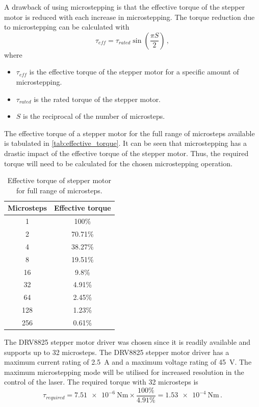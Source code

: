 A drawback of using microstepping is that the effective torque of the stepper motor is reduced with each increase in microstepping. The torque reduction due to microstepping can be calculated with
\begin{equation}
    \tau_{eff} = \tau_{rated} \sin \left(\frac{\pi S}{2}\right)\,,
\end{equation}
where
\begin{itemize}
    \item $\tau_{eff}$ is the effective torque of the stepper motor for a specific amount of microstepping.
    \item $\tau_{rated}$ is the rated torque of the stepper motor.
    \item $S$ is the reciprocal of the number of microsteps.
\end{itemize}

The effective torque of a stepper motor for the full range of microsteps available is tabulated in \autoref{tab:effective_torque}. It can be seen that microstepping has a drastic impact of the effective torque of the stepper motor. Thus, the required torque will need to be calculated for the chosen microstepping operation.
\begin{table}[h]
    \centering
    \begin{tabular}{|c|c|}
        \hline
        Microsteps & Effective torque \\
        \hline
        1          & 100\%            \\
        2          & 70.71\%          \\
        4          & 38.27\%          \\
        8          & 19.51\%          \\
        16         & 9.8\%            \\
        32         & 4.91\%           \\
        64         & 2.45\%           \\
        128        & 1.23\%           \\
        256        & 0.61\%           \\
        \hline
    \end{tabular}
    \caption{Effective torque of stepper motor for full range of microsteps.}
    \label{tab:effective_torque}
\end{table}

The DRV8825 stepper motor driver was chosen since it is readily available and supports up to 32 microsteps. The DRV8825 stepper motor driver has a maximum current rating of 2.5~A and a maximum voltage rating of 45~V. The maximum microstepping mode will be utilised for increased resolution in the control of the laser. The required torque with 32 microsteps is
\begin{equation}
    \tau_{required} = \SI{7.51e-6}{\newton\meter} \times \frac{100\%}{4.91\%} = \SI{1.53e-4}{\newton\meter}\,.
\end{equation}

